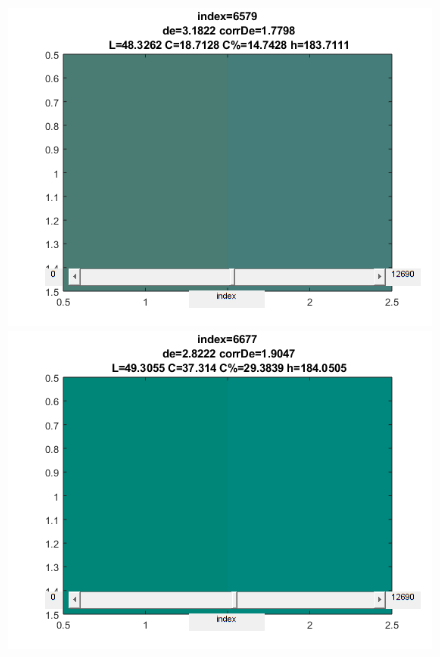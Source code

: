 \begin{figure}[!ht]
\begin{center}
	\includegraphics[scale=0.5]{images/6579.png}
	\includegraphics[scale=0.5]{images/6677.png}
\end{center}
\end{figure}

